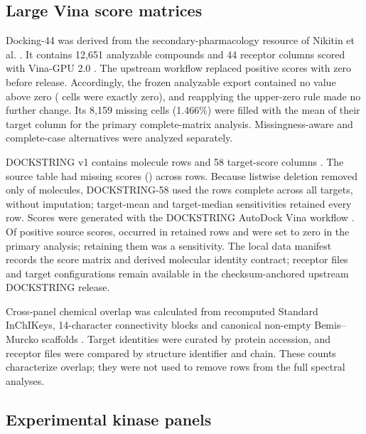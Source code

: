 \documentclass[11pt]{article}
\begin{document}
\subsection{Large Vina score matrices}

Docking-44 was derived from the secondary-pharmacology resource of Nikitin et al.
\cite{nikitin2025}. It contains 12,651 analyzable compounds and 44 receptor columns scored
with Vina-GPU 2.0 \cite{ding2023}. The upstream workflow replaced positive scores with zero before release.
Accordingly, the frozen analyzable export contained no value above zero
(\DffFrozenZeroCells{} cells were exactly zero), and reapplying the upper-zero rule made
no further change. Its 8,159 missing cells
(1.466\%) were filled with the mean of their target column for the primary complete-matrix
analysis. Missingness-aware and complete-case alternatives were analyzed separately.

DOCKSTRING v1 contains \DsReleaseRows{} molecule rows and 58 target-score columns
\cite{dockstring2022}. The source table had \DsMissingCells{} missing scores
(\DsMissingPercent{}) across \DsIncompleteRows{} rows. Because listwise deletion removed
only \DsIncompleteRowPercent{} of molecules, DOCKSTRING-58 used the \DsAnalysisRows{}
rows complete across all targets, without imputation; target-mean and target-median
sensitivities retained every row. Scores were generated with the DOCKSTRING AutoDock Vina
workflow \cite{vina2010}. Of \DsReleasePositiveCells{} positive source scores,
\DsAnalysisPositiveCells{} occurred in retained rows and were set to zero in the primary
analysis; retaining them was a sensitivity. The local data manifest records the score matrix and derived molecular
identity contract; receptor files and target configurations remain available in the
checksum-anchored upstream DOCKSTRING release.

Cross-panel chemical overlap was calculated from recomputed Standard InChIKeys,
14-character connectivity blocks and canonical non-empty Bemis--Murcko scaffolds
\cite{murcko1996}. Target identities were curated by protein accession, and receptor files
were compared by structure identifier and chain. These counts characterize overlap; they
were not used to remove rows from the full spectral analyses.

\subsection{Experimental kinase panels}
\end{document}
